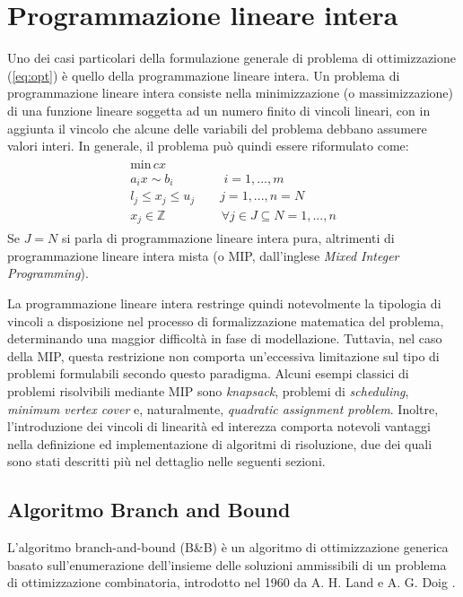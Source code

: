 \section{Programmazione lineare intera}
Uno dei casi particolari della formulazione generale di problema di ottimizzazione (\ref{eq:opt}) è quello della programmazione lineare intera.
Un problema di programmazione lineare intera consiste nella minimizzazione (o massimizzazione) di una funzione lineare soggetta ad un 
numero finito di vincoli lineari, con in aggiunta il vincolo che alcune delle variabili del problema debbano assumere valori interi. 
In generale, il problema può quindi essere riformulato come: 
\begin{align}
    \label{eq:mip}
	\begin{array}{l}
      \text{min} \, cx\\
      a_i x \sim b_i \qquad\qquad i=1,...,m \\
      l_j \leq x_j \leq u_j \qquad j=1,...,n =N \\
      x_j \in \mathbb{Z}  \;\,\qquad\qquad \forall j \in J \subseteq N = {1,...,n}	
	\end{array}
\end{align}
\indent
Se $J=N$ si parla di programmazione lineare intera pura, altrimenti di programmazione lineare intera mista (o MIP, dall'inglese 
\textit{Mixed Integer Programming}).

La programmazione lineare intera restringe quindi notevolmente la tipologia di vincoli a disposizione nel
processo di formalizzazione matematica del problema, determinando una maggior difficoltà in fase di modellazione.
Tuttavia, nel caso della MIP, questa restrizione non comporta un'eccessiva limitazione sul tipo di 
problemi formulabili secondo questo paradigma. Alcuni esempi classici di problemi risolvibili mediante MIP sono \textit{knapsack}, problemi di 
\textit{scheduling}, \textit{minimum vertex cover} e, naturalmente, \textit{quadratic assignment problem}.
Inoltre, l'introduzione dei vincoli di linearità ed interezza comporta notevoli vantaggi nella definizione ed
implementazione di algoritmi di risoluzione, due dei quali sono stati descritti più nel dettaglio nelle seguenti sezioni.

\subsection{Algoritmo Branch and Bound}
L'algoritmo branch-and-bound (B\&B) è un algoritmo di ottimizzazione generica basato sull'enumerazione dell'insieme delle soluzioni
ammissibili di un problema di ottimizzazione combinatoria, introdotto nel 1960 da A. H. Land e A. G. Doig \cite{10.2307/1910129}. 

